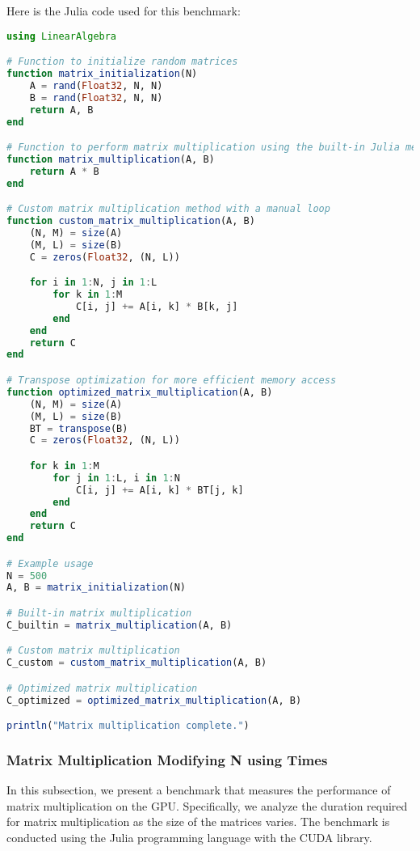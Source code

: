 Here is the Julia code used for this benchmark:

\begin{comment}

\end{comment}

\begin{lstlisting}[language=Julia]
using LinearAlgebra

# Function to initialize random matrices
function matrix_initialization(N)
    A = rand(Float32, N, N)
    B = rand(Float32, N, N)
    return A, B
end

# Function to perform matrix multiplication using the built-in Julia method
function matrix_multiplication(A, B)
    return A * B
end

# Custom matrix multiplication method with a manual loop
function custom_matrix_multiplication(A, B)
    (N, M) = size(A)
    (M, L) = size(B)
    C = zeros(Float32, (N, L))

    for i in 1:N, j in 1:L
        for k in 1:M
            C[i, j] += A[i, k] * B[k, j]
        end
    end
    return C
end

# Transpose optimization for more efficient memory access
function optimized_matrix_multiplication(A, B)
    (N, M) = size(A)
    (M, L) = size(B)
    BT = transpose(B)
    C = zeros(Float32, (N, L))

    for k in 1:M
        for j in 1:L, i in 1:N
            C[i, j] += A[i, k] * BT[j, k]
        end
    end
    return C
end

# Example usage
N = 500
A, B = matrix_initialization(N)

# Built-in matrix multiplication
C_builtin = matrix_multiplication(A, B)

# Custom matrix multiplication
C_custom = custom_matrix_multiplication(A, B)

# Optimized matrix multiplication
C_optimized = optimized_matrix_multiplication(A, B)

println("Matrix multiplication complete.")
\end{lstlisting}



\subsubsection{Matrix Multiplication Modifying N using Times}

In this subsection, we present a benchmark that measures the performance of matrix multiplication on the GPU. Specifically, we analyze the duration required for matrix multiplication as the size of the matrices varies. The benchmark is conducted using the Julia programming language with the CUDA library.

